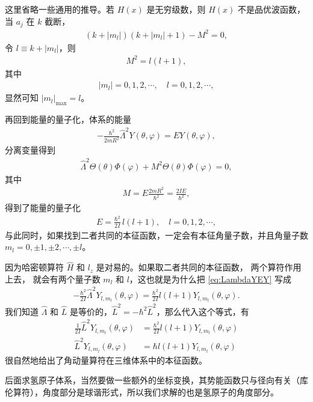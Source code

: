 这里省略一些通用的推导。若 $H(x)$ 是无穷级数，则 $H(x)$ 不是品优波函数，当 $a_j$ 在 $k$ 截断，
\begin{align}
    (k+|m_l|)(k+|m_l|+1) - M^2 = 0, 
\end{align}
令 $l \equiv k + |m_l|$，则
\begin{align}
    M^2 = l(l+1),
\end{align}
其中
\begin{align}
    |m_l| = 0,1,2,\cdots, \quad l = 0,1,2,\cdots,
\end{align}
显然可知 $|m_l|_{\mathrm{max}} = l$。

再回到能量的量子化，体系的能量
\begin{align}
    - \frac{\hbar^2}{2m R^2} \hat\Lambda ^2 Y(\theta, \varphi) = E Y(\theta, \varphi), 
    \label{eq:LambdaYEY}
\end{align}
分离变量得到
\begin{align}
    \hat \Lambda^2 \Theta(\theta) \Phi(\varphi) + M^2 \Theta(\theta) \Phi(\varphi)  = 0,
\end{align}
其中
\begin{align}
    M = E \frac{2mR^2}{\hbar^2} = \frac{2IE}{\hbar^2},
\end{align}
得到了能量的量子化
\begin{align}
    E = \frac{\hbar^2}{2I} \, l (l+1), \quad l = 0,1,2,\cdots,
\end{align}
与此同时，如果找到二者共同的本征函数，一定会有本征角量子数，并且角量子数 $m_l = 0, \pm1, \pm2, \cdots, \pm l$。

因为哈密顿算符 $\hat H$ 和 $l_z$ 是对易的。如果取二者共同的本征函数，
两个算符作用上去，
就会有两个量子数 $m_l$ 和 $l$，这也就是为什么把 \eqref{eq:LambdaYEY} 写成
\begin{align}
    - \frac{\hbar^2}{2I} \hat\Lambda^2 Y_{l,m_l}(\theta, \varphi) = \frac{\hbar^2}{2I} l(l+1) Y_{l,m_l}(\theta, \varphi). 
\end{align}
我们知道 $\hat \Lambda$ 和 $\hat L$ 是等价的，$\hat L^2 = -\hbar^2\hat L^2$，那么代入这个等式，有
\begin{align}
    \frac{1}{2I} \hat L^2 Y_{l,m_l}(\theta, \varphi) &= \frac{\hbar^2}{2I} l(l+1) Y_{l,m_l}(\theta, \varphi) \\
    \hat L^2 Y_{l,m_l}(\theta, \varphi) &= \hbar l (l+1) Y_{l,m_l}(\theta, \varphi)\label{eq:6_l_squared}
\end{align}
很自然地给出了角动量算符在三维体系中的本征函数。

后面求氢原子体系，当然要做一些额外的坐标变换，其势能函数只与径向有关（库伦算符），角度部分是球谐形式，所以我们求解的也是氢原子的角度部分。

